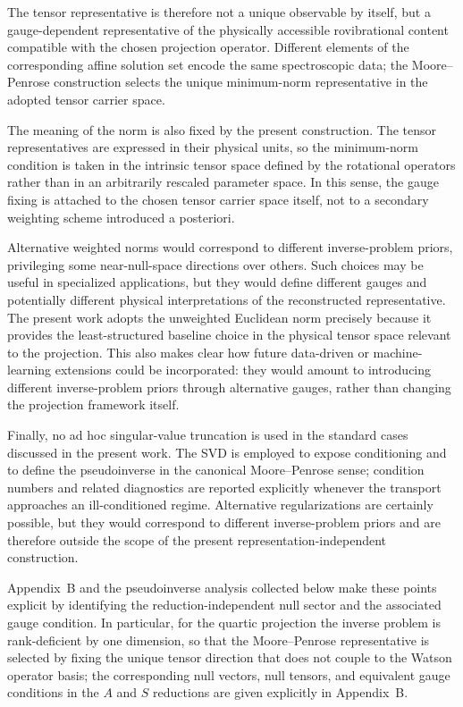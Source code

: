 \documentclass[aip,jcp,reprint,floatfix]{revtex4-2}
\begin{document}
The tensor representative is therefore not a unique observable by
itself, but a gauge-dependent representative of the physically
accessible rovibrational content compatible with the chosen projection
operator. Different elements of the corresponding affine solution set
encode the same spectroscopic data; the Moore--Penrose construction
selects the unique minimum-norm representative in the adopted tensor
carrier space.

The meaning of the norm is also fixed by the present construction. The
tensor representatives are expressed in their physical units, so the
minimum-norm condition is taken in the intrinsic tensor space defined
by the rotational operators rather than in an arbitrarily rescaled
parameter space. In this sense, the gauge fixing is attached to the
chosen tensor carrier space itself, not to a secondary weighting
scheme introduced a posteriori.

Alternative weighted norms would correspond to different
inverse-problem priors, privileging some near-null-space directions
over others. Such choices may be useful in specialized applications,
but they would define different gauges and potentially different
physical interpretations of the reconstructed representative. The
present work adopts the unweighted Euclidean norm precisely because it
provides the least-structured baseline choice in the physical tensor
space relevant to the projection. This also makes clear how future
data-driven or machine-learning extensions could be incorporated: they
would amount to introducing different inverse-problem priors through
alternative gauges, rather than changing the projection framework
itself.

Finally, no ad hoc singular-value truncation is used in the standard
cases discussed in the present work. The SVD is employed to expose
conditioning and to define the pseudoinverse in the canonical
Moore--Penrose sense; condition numbers and related diagnostics are
reported explicitly whenever the transport approaches an
ill-conditioned regime. Alternative regularizations are certainly
possible, but they would correspond to different inverse-problem
priors and are therefore outside the scope of the present
representation-independent construction.

Appendix~B and the pseudoinverse analysis collected below make these
points explicit by identifying the reduction-independent null sector
and the associated gauge condition. In particular, for the quartic
projection the inverse problem is rank-deficient by one dimension, so
that the Moore--Penrose representative is selected by fixing the unique
tensor direction that does not couple to the Watson operator basis; the
corresponding null vectors, null tensors, and equivalent gauge
conditions in the $A$ and $S$ reductions are given explicitly in
Appendix~B.
\end{document}
